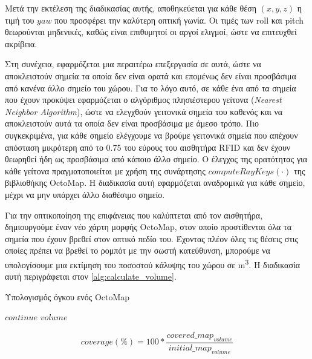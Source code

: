 Μετά την εκτέλεση της διαδικασίας αυτής, αποθηκεύεται για κάθε θέση $(x, y, z)$ η τιμή του $yaw$ που προσφέρει την καλύτερη οπτική γωνία. Οι τιμές των roll και pitch θεωρούνται μηδενικές, καθώς είναι επιθυμητοί οι αργοί ελιγμοί, ώστε να επιτευχθεί ακρίβεια.

Στη συνέχεια, εφαρμόζεται μια περαιτέρω επεξεργασία σε αυτά, ώστε να αποκλειστούν σημεία τα οποία δεν είναι ορατά και επομένως δεν είναι προσβάσιμα από κανένα άλλο σημείο του χώρου. Για το λόγο αυτό, σε κάθε ένα από τα σημεία που έχουν προκύψει εφαρμόζεται ο αλγόριθμος πλησιέστερου γείτονα (\emph{Nearest Neighbor Algorithm}), ώστε να ελεγχθούν γειτονικά σημεία του καθενός και να αποκλειστούν αυτά τα οποία δεν είναι προσβάσιμα με άμεσο τρόπο. Πιο συγκεκριμένα, για κάθε σημείο ελέγχουμε να βρούμε γειτονικά σημεία που απέχουν απόσταση μικρότερη από το 0.75 του εύρους του αισθητήρα RFID και δεν έχουν θεωρηθεί ήδη ως προσβάσιμα από κάποιο άλλο σημείο. Ο έλεγχος της ορατότητας για κάθε γείτονα πραγματοποιείται με χρήση της συνάρτησης $computeRayKeys(\cdot)$ της βιβλιοθήκης OctoMap. Η διαδικασία αυτή εφαρμόζεται αναδρομικά για κάθε σημείο, μέχρι να μην υπάρχει άλλο διαθέσιμο σημείο. 

Για την οπτικοποίηση της επιφάνειας που καλύπτεται από τον αισθητήρα, δημιουργούμε έναν νέο χάρτη μορφής OctoMap, στον οποίο προστίθενται όλα τα σημεία που έχουν βρεθεί στον οπτικό πεδίο του. Έχοντας πλέον όλες τις θέσεις στις οποίες πρέπει να βρεθεί το ρομπότ με την σωστή κατεύθυνση, μπορούμε να υπολογίσουμε μια εκτίμηση του ποσοστού κάλυψης του χώρου σε \si{\cubic\metre}. Η διαδικασία αυτή περιγράφεται στον \autoref{alg:calculate_volume}.

\newcommand{\pluseq}{\mathrel{+}=}

\begin{algorithm}[!ht]
 \caption{Υπολογισμός όγκου ενός OctoMap}
 \label{alg:calculate_volume}
    \begin{algorithmic}[1]
                \State $continue$
            \EndIf
                \State {$volume \pluseq node(i).size * node(i).size * node(i).size$}
            \EndIf
        \EndFor
        \State \Return $volume$
    \end{algorithmic}
\end{algorithm}

\begin{equation*}
    coverage (\%) = 100 * \frac{covered\_map_{volume}}{initial\_map_{volume}} 
\end{equation*}

